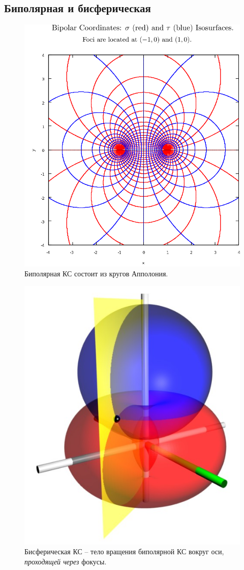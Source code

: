 \documentclass[12pt]{report}
\begin{document}
 \subsection{Биполярная и бисферическая}
 \begin{figure}[h]\centering
 	\includegraphics[width=.8\linewidth]{bipolar_cs}
 	\caption{Биполярная КС состоит из кругов Апполония.}
 \end{figure}
\begin{figure}[h]\centering
	\includegraphics[height=.33\paperheight]{Bispherical_coordinates}
	\caption{Бисферическая КС -- тело вращения биполярной КС вокруг оси, \emph{проходящей через} фокусы.}
\end{figure}
 
\end{document}
